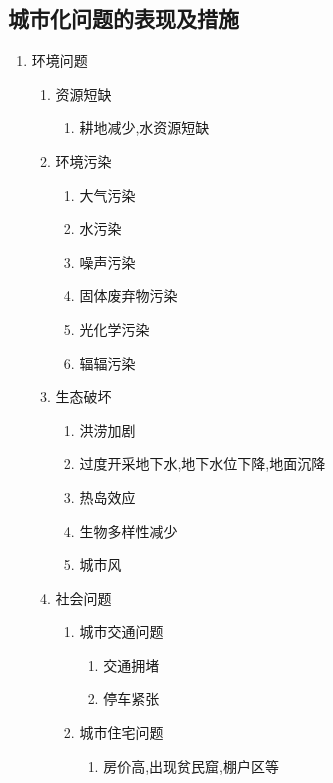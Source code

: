 \documentclass[a4paper]{article}
\begin{document}
    \subsection{城市化问题的表现及措施}
    \begin{enumerate}
        \item 环境问题
        \begin{enumerate}
            \item 资源短缺
            \begin{enumerate}
                \item 耕地减少,水资源短缺
            \end{enumerate}
            \item 环境污染
            \begin{enumerate}
                \item 大气污染
                \item 水污染
                \item 噪声污染
                \item 固体废弃物污染
                \item 光化学污染
                \item 辐辐污染
            \end{enumerate}
            \item 生态破坏
            \begin{enumerate}
                \item 洪涝加剧
                \item 过度开采地下水,地下水位下降,地面沉降
                \item 热岛效应
                \item 生物多样性减少
                \item 城市风
            \end{enumerate}
            \item 社会问题
            \begin{enumerate}
                \item 城市交通问题
                \begin{enumerate}
                    \item 交通拥堵
                    \item 停车紧张
                \end{enumerate}
                \item 城市住宅问题
                \begin{enumerate}
                    \item 房价高,出现贫民窟,棚户区等

\end{enumerate}
\end{enumerate}
\end{enumerate}
\end{enumerate}
\end{document}
